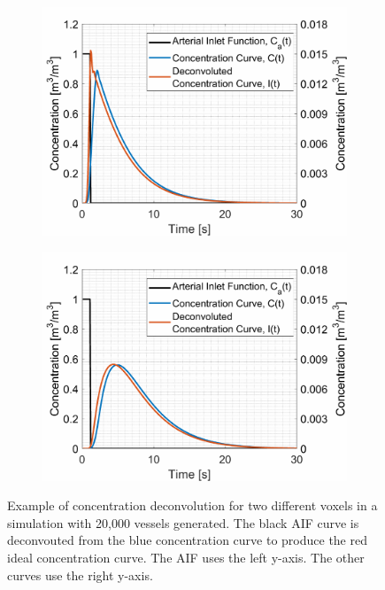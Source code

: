 \documentclass[11pt,english,a4paper,twoside,openright]{report}
\begin{document}
{{{{{{{{\begin{figure}[h]
	\centering
	\begin{subfigure}[b]{0.49\textwidth}
		\includegraphics[width=\textwidth]{Chapter4/ConcentrationDeconvolution}
	\end{subfigure}
	\begin{subfigure}[b]{0.49\textwidth}
		\includegraphics[width=\textwidth]{Chapter4/ConcentrationDeconvolution2}
	\end{subfigure}
	
	\caption[Example of concentration deconvolution for two different voxels in a simulation with 20,000 vessels generated]{Example of concentration deconvolution for two different voxels in a simulation with 20,000 vessels generated. The black AIF curve is deconvouted from the blue concentration curve to produce the red ideal concentration curve. The AIF uses the left y-axis. The other curves use the right y-axis.}
	\label{fig:ConcentrationDeconvolution}
\end{figure}

}}}}}}}}
\end{document}

